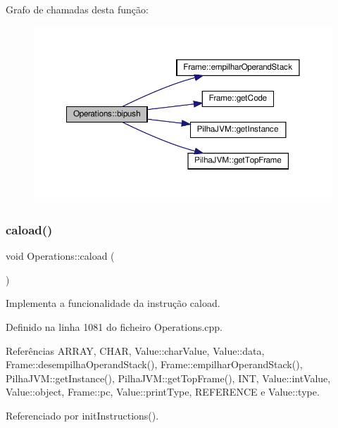 Grafo de chamadas desta função\+:
\nopagebreak
\begin{figure}[H]
\begin{center}
\leavevmode
\includegraphics[width=350pt]{classOperations_a981b0f43cbe76b4fe7e2122c482d4a5b_cgraph}
\end{center}
\end{figure}
\mbox{\label{classOperations_a4bb55ffc2ba79a76a019a0c02d29d7f9}} 
\subsubsection{\texorpdfstring{caload()}{caload()}}
{\footnotesize\ttfamily void Operations\+::caload (\begin{DoxyParamCaption}{ }\end{DoxyParamCaption})\hspace{0.3cm}{\ttfamily [private]}}



Implementa a funcionalidade da instrução caload. 



Definido na linha 1081 do ficheiro Operations.\+cpp.



Referências A\+R\+R\+AY, C\+H\+AR, Value\+::char\+Value, Value\+::data, Frame\+::desempilha\+Operand\+Stack(), Frame\+::empilhar\+Operand\+Stack(), Pilha\+J\+V\+M\+::get\+Instance(), Pilha\+J\+V\+M\+::get\+Top\+Frame(), I\+NT, Value\+::int\+Value, Value\+::object, Frame\+::pc, Value\+::print\+Type, R\+E\+F\+E\+R\+E\+N\+CE e Value\+::type.



Referenciado por init\+Instructions().

